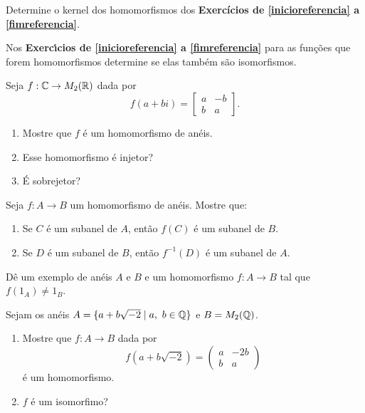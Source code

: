 \documentclass[12pt]{exam}
\begin{document}
\vspace{.3cm}

\questao{} Determine o kernel dos homomorfismos dos \textbf{Exerc{\'i}cios de \ref{inicioreferencia} a \ref{fimreferencia}}.

\vspace{.3cm}

\questao{} Nos \textbf{Exerc{\'\i}cios de \ref{inicioreferencia} a \ref{fimreferencia}} para as fun\c{c}\~oes que forem homomorfismos determine se elas tamb\'em s\~ao isomorfismos.

\vspace{.3cm}

\questao{} Seja $f : \mathbb{C} \to M_2(\mathbb{R})$ dada por
\[
	f(a + bi) = \begin{bmatrix}
		a & -b\\
		b & a
	\end{bmatrix}.
\]
\begin{enumerate}[label=({\alph*})]
	\item Mostre que $f$ \'e um homomorfismo de an\'eis.
	\item Esse homomorfismo \'e injetor?
	\item \'E sobrejetor?
\end{enumerate}

\vspace{.3cm}

\questao{} Seja $f: A \to B$ um homomorfismo de an{\'e}is. Mostre que:
\begin{enumerate}[label=({\alph*})]
\item Se $C$  {\'e} um subanel de $A$, ent{\~a}o $f(C)$ {\'e} um subanel de $B$.
\item Se $D$ {\'e} um subanel de $B$, ent{\~a}o $f^{-1}(D)$ {\'e} um subanel de $A$.
\end{enumerate}

\vspace{.3cm}

\questao{} D{\^e} um exemplo de an{\'e}is $A$ e $B$ e um homomorfismo $f : A \to B$ tal que $f(1_A) \ne 1_B$.

\vspace{.3cm}

\questao{} Sejam os an{\'e}is $A = \{ a + b\sqrt{-2} \mid a,\ b \in \mathbb{Q}\}$ e $B = M_2(\mathbb{Q})$.
\begin{enumerate}[label=({\alph*})]
\item Mostre que $f : A \to B$ dada por
\[
f(a + b\sqrt{-2}) =
\begin{pmatrix}
a & -2b\\
b & a
\end{pmatrix}
\]
{\'e} um homomorfismo.
\item $f$ {\'e} um isomorfimo?
\end{enumerate}
\end{document}
